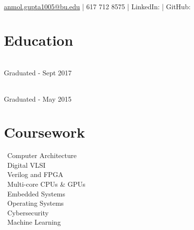 \documentclass[]{deedy_format_Anmol}
\begin{document}
%
%
\lastupdated

%
%


{\href{mailto:anmol.gupta1005@bu.edu}{anmol.gupta1005@bu.edu} | 617 712 8575 | 
LinkedIn:  \href{https://www.linkedin.com/in/anmol-gupta-90b67a108}{} |
GitHub:   \href{https://github.com/anmolgupta1005/}{}
}

%
%

\begin{minipage}[t]{0.325\textwidth} 


\section{Education} 
\vspace{0.5mm} %
\\
Graduated - Sept 2017 \\
\sectionsep

\\		
Graduated - May 2015 \\
\sectionsep

\sectionsep

\section{Coursework}
\vspace{0.5mm} %
\flushleft
\textbullet \, Computer Architecture\\
\textbullet \, Digital VLSI \\
\textbullet \, Verilog and FPGA\\
\textbullet \, Multi-core CPUs \& GPUs\\
\textbullet \, Embedded Systems\\
\textbullet \, Operating Systems\\
\textbullet \, Cybersecurity\\
\textbullet \, Machine Learning
\sectionsep



\end{minipage}
\end{document}
